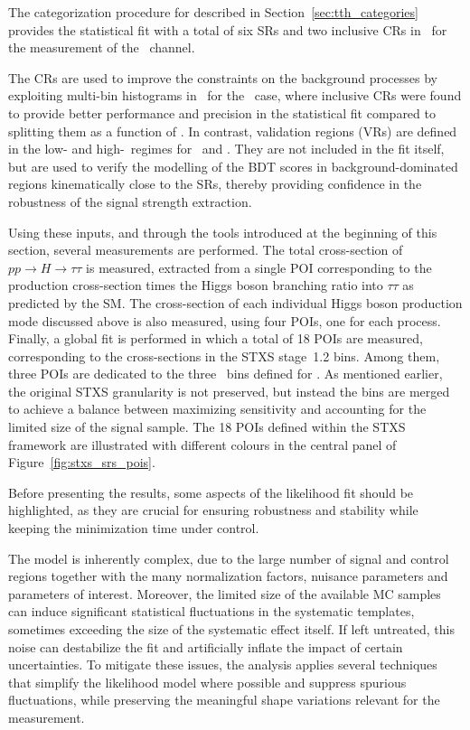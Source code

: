 The categorization procedure for \ttH described in Section~\ref{sec:tth_categories} provides the statistical fit with a total of six SRs and two inclusive CRs in \pth\ for the measurement of the \tauhadhad\ channel. 

The CRs are used to improve the constraints on the background processes by exploiting multi-bin histograms in \mmc\ for the \ttHtt\ case, 
where inclusive CRs were found to provide better performance and precision in the statistical fit compared to splitting them as a function of \pth. 
In contrast, validation regions (VRs) are defined in the low- and high-\pt\ regimes for \ztautau\ and \ttbar. They are not included in the fit itself, but are used to verify the modelling of the BDT scores in background-dominated regions kinematically close to the SRs, thereby providing confidence in the robustness of the signal strength extraction.

Using these inputs, and through the tools introduced at the beginning of this section, several measurements are performed. 
The total cross-section of $pp \to H \to \tau\tau$ is measured, 
extracted from a single POI corresponding to the production cross-section times the Higgs boson branching ratio into $\tau\tau$ as predicted by the SM.
The cross-section of each individual Higgs boson production mode discussed above is also measured, 
using four POIs, one for each process.
Finally, a global fit is performed in which a total of 18 POIs are measured, 
corresponding to the cross-sections in the STXS stage~1.2 bins. 
Among them, three POIs are dedicated to the three \pth\ bins defined for \ttH. 
As mentioned earlier, the original STXS granularity is not preserved, but instead the bins are merged to achieve a balance between maximizing sensitivity 
and accounting for the limited size of the signal sample. 
The 18 POIs defined within the STXS framework are illustrated with different colours in the central panel of Figure~\ref{fig:stxs_srs_pois}.

Before presenting the results, some aspects of the likelihood fit should be highlighted, as they are crucial for ensuring robustness and stability while keeping the minimization time under control.

The model is inherently complex, due to the large number of signal and control regions together with the many normalization factors, nuisance parameters and parameters of interest. 
Moreover, the limited size of the available MC samples can induce significant statistical fluctuations in the systematic templates, sometimes exceeding the size of the systematic effect itself. 
If left untreated, this noise can destabilize the fit and artificially inflate the impact of certain uncertainties. 
To mitigate these issues, the analysis applies several techniques that simplify the likelihood model where possible and suppress spurious fluctuations, while preserving the meaningful shape variations relevant for the measurement. 

